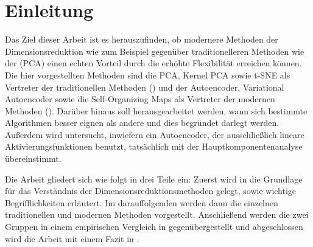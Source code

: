 \chapter{Einleitung}
\label{ch:Enleitung}


Das Ziel dieser Arbeit ist es herauszufinden, ob modernere Methoden der Dimensionsreduktion wie zum
Beispiel  gegenüber traditionelleren Methoden wie der
 (PCA) einen echten Vorteil durch die erhöhte Flexibilität
erreichen können. Die hier vorgestellten Methoden sind die PCA, Kernel PCA sowie t-SNE als Vertreter
der traditionellen Methoden () und der Autoencoder,
Variational Autoencoder sowie die Self-Organizing Maps als Vertreter der modernen Methoden
(). Darüber hinaus soll herausgearbeitet werden, wann sich
bestimmte Algorithmen besser eignen als andere und dies begründet darlegt werden. Außerdem wird
untersucht, inwiefern ein Autoencoder, der ausschließlich lineare Aktivierungsfunktionen benutzt,
tatsächlich mit der Hauptkomponentenanalyse übereinstimmt.

Die Arbeit gliedert sich wie folgt in drei Teile ein: Zuerst wird in
 die Grundlage für das Verständnis der Dimensionsreduktionsmethoden
gelegt, sowie wichtige Begrifflichkeiten erläutert. Im darauffolgenden
 werden dann die einzelnen traditionellen und modernen Methoden
vorgestellt. Anschließend werden die zwei Gruppen in einem empirischen Vergleich in
 gegenübergestellt und abgeschlossen wird die Arbeit mit einem Fazit in
.